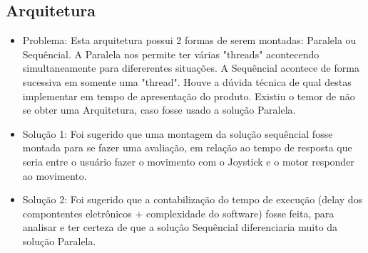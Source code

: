 \subsection{Arquitetura}
 \begin{itemize}
      \item Problema: Esta arquitetura possui 2 formas de serem montadas: Paralela ou Sequêncial. A Paralela nos permite ter várias "threads" acontecendo simultaneamente para difererentes situações. A Sequêncial acontece de forma sucessiva em somente uma  "thread". Houve a dúvida técnica de qual destas implementar em tempo de apresentação do produto. Existiu o temor de não se obter uma Arquitetura, caso fosse usado a solução Paralela.

	  \item Solução 1: Foi sugerido que uma montagem da solução sequêncial fosse montada para se fazer uma avaliação, em relação ao tempo de resposta que seria entre o usuário fazer o movimento com o Joystick e o motor responder ao movimento.
  \item Solução 2: Foi sugerido que a contabilização do tempo de execução (delay dos compontentes eletrônicos + complexidade do software) fosse feita, para analisar e ter certeza de que a solução Sequêncial diferenciaria muito da solução Paralela.

    \end{itemize}

